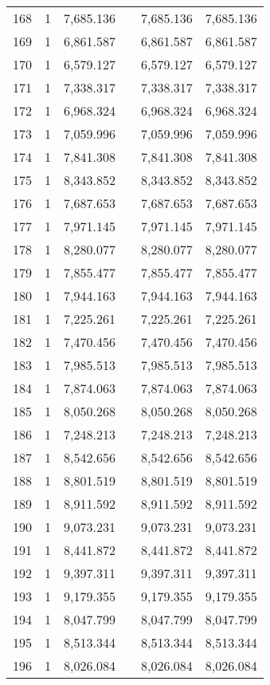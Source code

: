 \begin{table}[!htbp]
\begin{tabular}{@{\extracolsep{5pt}}lccccc}
168 & 1 & 7,685.136 &  & 7,685.136 & 7,685.136 \\ 
169 & 1 & 6,861.587 &  & 6,861.587 & 6,861.587 \\ 
170 & 1 & 6,579.127 &  & 6,579.127 & 6,579.127 \\ 
171 & 1 & 7,338.317 &  & 7,338.317 & 7,338.317 \\ 
172 & 1 & 6,968.324 &  & 6,968.324 & 6,968.324 \\ 
173 & 1 & 7,059.996 &  & 7,059.996 & 7,059.996 \\ 
174 & 1 & 7,841.308 &  & 7,841.308 & 7,841.308 \\ 
175 & 1 & 8,343.852 &  & 8,343.852 & 8,343.852 \\ 
176 & 1 & 7,687.653 &  & 7,687.653 & 7,687.653 \\ 
177 & 1 & 7,971.145 &  & 7,971.145 & 7,971.145 \\ 
178 & 1 & 8,280.077 &  & 8,280.077 & 8,280.077 \\ 
179 & 1 & 7,855.477 &  & 7,855.477 & 7,855.477 \\ 
180 & 1 & 7,944.163 &  & 7,944.163 & 7,944.163 \\ 
181 & 1 & 7,225.261 &  & 7,225.261 & 7,225.261 \\ 
182 & 1 & 7,470.456 &  & 7,470.456 & 7,470.456 \\ 
183 & 1 & 7,985.513 &  & 7,985.513 & 7,985.513 \\ 
184 & 1 & 7,874.063 &  & 7,874.063 & 7,874.063 \\ 
185 & 1 & 8,050.268 &  & 8,050.268 & 8,050.268 \\ 
186 & 1 & 7,248.213 &  & 7,248.213 & 7,248.213 \\ 
187 & 1 & 8,542.656 &  & 8,542.656 & 8,542.656 \\ 
188 & 1 & 8,801.519 &  & 8,801.519 & 8,801.519 \\ 
189 & 1 & 8,911.592 &  & 8,911.592 & 8,911.592 \\ 
190 & 1 & 9,073.231 &  & 9,073.231 & 9,073.231 \\ 
191 & 1 & 8,441.872 &  & 8,441.872 & 8,441.872 \\ 
192 & 1 & 9,397.311 &  & 9,397.311 & 9,397.311 \\ 
193 & 1 & 9,179.355 &  & 9,179.355 & 9,179.355 \\ 
194 & 1 & 8,047.799 &  & 8,047.799 & 8,047.799 \\ 
195 & 1 & 8,513.344 &  & 8,513.344 & 8,513.344 \\ 
196 & 1 & 8,026.084 &  & 8,026.084 & 8,026.084 \\ 

\end{tabular}
\end{table}
